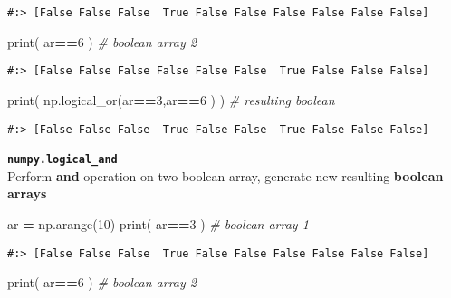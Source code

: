 \documentclass[
]{book}
\newenvironment{Shaded}{\begin{snugshade}}{\end{snugshade}}
\newcommand{\BuiltInTok}[1]{#1}
\newcommand{\CommentTok}[1]{\textcolor[rgb]{0.37,0.37,0.37}{\textit{#1}}}
\newcommand{\DecValTok}[1]{\textcolor[rgb]{0.06,0.06,0.06}{#1}}
\newcommand{\NormalTok}[1]{#1}
\newcommand{\OperatorTok}[1]{\textcolor[rgb]{0.43,0.43,0.43}{\textbf{#1}}}
\begin{document}
\begin{verbatim}
#:> [False False False  True False False False False False False]
\end{verbatim}

\begin{Shaded}
\begin{Highlighting}[]
\BuiltInTok{print}\NormalTok{( ar}\OperatorTok{==}\DecValTok{6}\NormalTok{ )  }\CommentTok{\# boolean array 2}
\end{Highlighting}
\end{Shaded}

\begin{verbatim}
#:> [False False False False False False  True False False False]
\end{verbatim}

\begin{Shaded}
\begin{Highlighting}[]
\BuiltInTok{print}\NormalTok{( np.logical\_or(ar}\OperatorTok{==}\DecValTok{3}\NormalTok{,ar}\OperatorTok{==}\DecValTok{6}\NormalTok{ ) ) }\CommentTok{\# resulting boolean}
\end{Highlighting}
\end{Shaded}

\begin{verbatim}
#:> [False False False  True False False  True False False False]
\end{verbatim}

\textbf{\texttt{numpy.logical\_and}}~\\
Perform \textbf{and} operation on two boolean array, generate new resulting \textbf{boolean arrays}

\begin{Shaded}
\begin{Highlighting}[]
\NormalTok{ar }\OperatorTok{=}\NormalTok{ np.arange(}\DecValTok{10}\NormalTok{)}
\BuiltInTok{print}\NormalTok{( ar}\OperatorTok{==}\DecValTok{3}\NormalTok{ ) }\CommentTok{\# boolean array 1}
\end{Highlighting}
\end{Shaded}

\begin{verbatim}
#:> [False False False  True False False False False False False]
\end{verbatim}

\begin{Shaded}
\begin{Highlighting}[]
\BuiltInTok{print}\NormalTok{( ar}\OperatorTok{==}\DecValTok{6}\NormalTok{ ) }\CommentTok{\# boolean array 2}
\end{Highlighting}
\end{Shaded}
\end{document}
